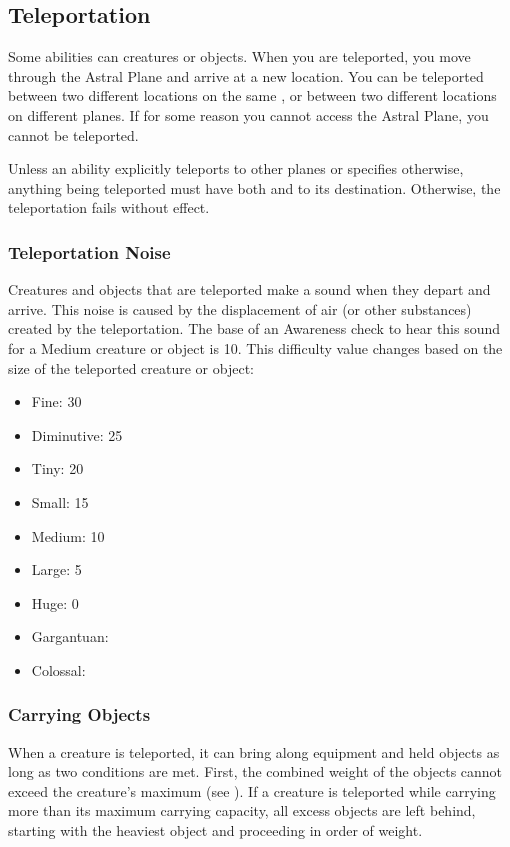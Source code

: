     \subsection{Teleportation}\label{Teleportation}
        Some abilities can  creatures or objects.
        When you are teleported, you move through the Astral Plane and arrive at a new location.
        You can be teleported between two different locations on the same , or between two different locations on different planes.
        If for some reason you cannot access the Astral Plane, you cannot be teleported.

        Unless an ability explicitly teleports to other planes or specifies otherwise, anything being teleported must have both  and  to its destination.
        Otherwise, the teleportation fails without effect.

        \subsubsection{Teleportation Noise}\label{Teleportation Noise}
            Creatures and objects that are teleported make a sound when they depart and arrive.
            This noise is caused by the displacement of air (or other substances) created by the teleportation.
            The base  of an Awareness check to hear this sound for a Medium creature or object is 10.
            This difficulty value changes based on the size of the teleported creature or object:

            \begin{itemize}
                \item Fine: 30
                \item Diminutive: 25
                \item Tiny: 20
                \item Small: 15
                \item Medium: 10
                \item Large: 5
                \item Huge: 0
                \item Gargantuan: 
                \item Colossal: 
            \end{itemize}

        \subsubsection{Carrying Objects}
            When a creature is teleported, it can bring along equipment and held objects as long as two conditions are met.
            First, the combined weight of the objects cannot exceed the creature's maximum  (see ).
            If a creature is teleported while carrying more than its maximum carrying capacity, all excess objects are left behind, starting with the heaviest object and proceeding in order of weight.

